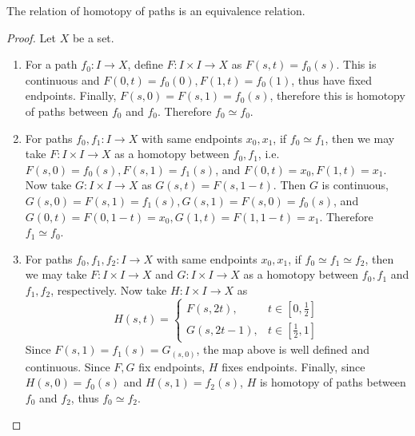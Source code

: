 \begin{prop} The relation of homotopy of paths is an equivalence relation.
\end{prop}
\begin{proof} Let $X$ be a set.
\begin{enumerate}
\item For a path $f_0:I\rightarrow X$, define $F:I\times I\rightarrow X$ as $F(s,t)=f_0(s)$. This is continuous and $F(0,t)=f_0(0), F(1,t)=f_0(1)$, thus have fixed endpoints. Finally, $F(s,0)=F(s,1)=f_0(s)$, therefore this is homotopy of paths between $f_0$ and $f_0$. Therefore $f_0\simeq f_0$.
\item For paths $f_0,f_1:I\rightarrow X$ with same endpoints $x_0,x_1$, if $f_0\simeq f_1$, then we may take $F:I\times I\rightarrow X$ as a homotopy between $f_0,f_1$, i.e. $F(s,0)=f_0(s), F(s,1)=f_1(s)$, and $F(0,t)=x_0,F(1,t)=x_1$. Now take $G:I\times I\rightarrow X$ as $G(s,t)=F(s,1-t)$. Then $G$ is continuous, $G(s,0)=F(s,1)=f_1(s), G(s,1)=F(s,0)=f_0(s)$, and $G(0,t)=F(0,1-t)=x_0, G(1,t)=F(1,1-t)=x_1$. Therefore $f_1\simeq f_0$.
\item For paths $f_0,f_1,f_2:I\rightarrow X$ with same endpoints $x_0,x_1$, if $f_0\simeq f_1\simeq f_2$, then we may take $F:I\times I\rightarrow X$ and $G:I\times I\rightarrow X$ as a homotopy between $f_0,f_1$ and $f_1,f_2$, respectively. Now take $H:I\times I\rightarrow X$ as
\begin{equation}
H(s,t)=\begin{cases}F(s,2t),&t\in[0,\frac{1}{2}]\\
G(s,2t-1),&t\in [\frac{1}{2},1]
\end{cases}
\end{equation}
Since $F(s,1)=f_1(s)=G_(s,0)$, the map above is well defined and continuous. Since $F,G$ fix endpoints, $H$ fixes endpoints. Finally, since $H(s,0)=f_0(s)$ and $H(s,1)=f_2(s)$, $H$ is homotopy of paths between $f_0$ and $f_2$, thus $f_0\simeq f_2$.
\end{enumerate}
\end{proof}

